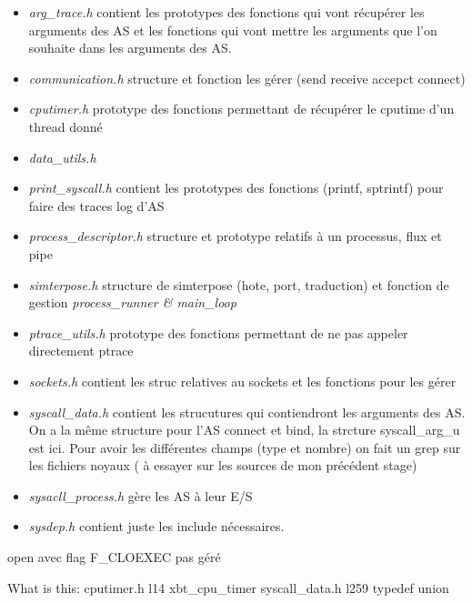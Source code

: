 \documentclass{article}
\begin{document}
\begin{itemize}
\item \textit{{\color{brown}arg\_trace.h}} contient les prototypes des
  fonctions qui vont récupérer les arguments des AS et les fonctions
  qui vont mettre les arguments que l'on souhaite dans les arguments
  des AS.
\item \textit{communication.h} structure et fonction les gérer (send
  receive accepct connect)
\item \textit{cputimer.h} prototype des fonctions permettant de
  récupérer le cputime d'un thread donné
\item \textit{{\color{red} data\_utils.h}}
\item \textit{print\_syscall.h} contient les prototypes des fonctions
  (printf, sptrintf) pour faire des traces log d'AS
\item \textit{{\color{brown}process\_descriptor.h}} structure et
  prototype relatifs à un processus, flux et pipe
\item \textit{simterpose.h} structure de simterpose (hote, port,
  traduction) et fonction de gestion \textit{process\_runner \&
    main\_loop}
\item \textit{ptrace\_utils.h} prototype des fonctions permettant de
  ne pas appeler directement ptrace
\item \textit{sockets.h} contient les struc relatives au sockets et
  les fonctions pour les gérer
\item \textit{{\color{brown}syscall\_data.h}} contient les strucutures
  qui contiendront les arguments des AS. On a la même structure pour
  l'AS connect et bind, la strcture {\color{red} syscall\_arg\_u} est
  ici. Pour avoir les différentes champs (type et nombre) on fait un
  grep sur les fichiers noyaux ( {\color{red} à essayer sur les
    sources de mon précédent stage})
\item \textit{{\color{brown} sysacll\_process.h }} gère les AS à leur
  E/S
\item \textit{sysdep.h} contient juste les include nécessaires.
\end{itemize}

open avec flag F\_CLOEXEC pas géré

\begin{tikzpicture}

\end{tikzpicture}

What is this: cputimer.h l14 {\color{purple} xbt\_cpu\_timer}
syscall\_data.h l259 {\color{purple} typedef union}
\end{document}
